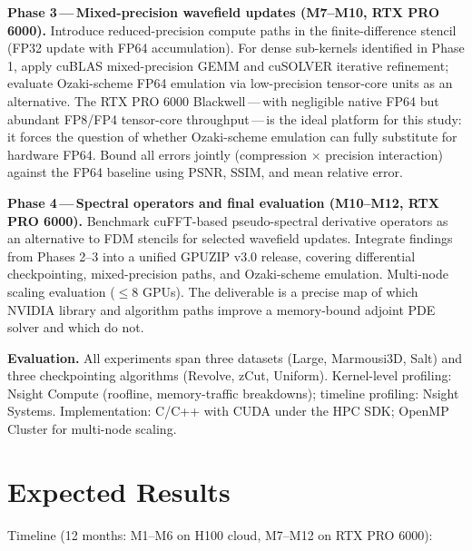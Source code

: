 \documentclass[11pt,a4paper]{article}
\newcommand{\gpuzip}{GPUZIP}
\begin{document}
\textbf{Phase 3\,---\,Mixed-precision wavefield updates (M7--M10, RTX PRO
6000).} Introduce reduced-precision compute paths in the finite-difference
stencil (FP32 update with FP64 accumulation). For dense sub-kernels identified
in Phase 1, apply cuBLAS mixed-precision GEMM and cuSOLVER iterative
refinement; evaluate Ozaki-scheme FP64 emulation via low-precision tensor-core
units as an alternative. The RTX PRO 6000 Blackwell\,---\,with negligible native
FP64 but abundant FP8/FP4 tensor-core throughput\,---\,is the ideal platform for
this study: it forces the question of whether Ozaki-scheme emulation can fully
substitute for hardware FP64. Bound all errors jointly (compression $\times$
precision interaction) against the FP64 baseline using PSNR, SSIM, and mean
relative error.

\textbf{Phase 4\,---\,Spectral operators and final evaluation (M10--M12, RTX PRO
6000).} Benchmark cuFFT-based pseudo-spectral derivative operators as an
alternative to FDM stencils for selected wavefield updates. Integrate findings
from Phases 2--3 into a unified \gpuzip{} v3.0 release, covering differential
checkpointing, mixed-precision paths, and Ozaki-scheme emulation. Multi-node
scaling evaluation ($\leq$8 GPUs). The deliverable is a precise map of which
NVIDIA library and algorithm paths improve a memory-bound adjoint PDE solver and
which do not.

\textbf{Evaluation.} All experiments span three datasets (Large, Marmousi3D,
Salt) and three checkpointing algorithms (Revolve, zCut, Uniform). Kernel-level
profiling: Nsight Compute (roofline, memory-traffic breakdowns); timeline
profiling: Nsight Systems. Implementation: C/C++ with CUDA under the HPC SDK;
OpenMP Cluster for multi-node scaling.

\section*{Expected Results}

Timeline (12 months: M1--M6 on H100 cloud, M7--M12 on RTX PRO 6000):
\end{document}
